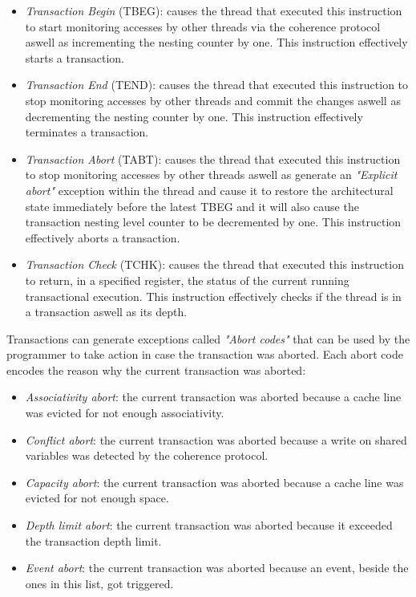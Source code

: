 \documentclass{article}
\begin{document}
            \begin{itemize}

                \item \textit{Transaction Begin} (TBEG): causes the thread that executed this instruction to start monitoring accesses by other threads via the coherence protocol aswell as incrementing the nesting counter by one. This instruction effectively starts a transaction.
                \item \textit{Transaction End} (TEND): causes the thread that executed this instruction to stop monitoring accesses by other threads and commit the changes aswell as decrementing the nesting counter by one. This instruction effectively terminates a transaction.
                \item \textit{Transaction Abort} (TABT): causes the thread that executed this instruction to stop monitoring accesses by other threads aswell as generate an \textit{"Explicit abort"} exception within the thread and cause it to restore the architectural state immediately before the latest TBEG and it will also cause the transaction nesting level counter to be decremented by one. This instruction effectively aborts a transaction.
                \item \textit{Transaction Check} (TCHK): causes the thread that executed this instruction to return, in a specified register, the status of the current running transactional execution. This instruction effectively checks if the thread is in a transaction aswell as its depth.

            \end{itemize}

            Transactions can generate exceptions called \textit{"Abort codes"} that can be used by the programmer to take action in case the transaction was aborted. Each abort code encodes the reason why the current transaction was aborted:

            \begin{itemize}

                \item \textit{Associativity abort}: the current transaction was aborted because a cache line was evicted for not enough associativity.
                \item \textit{Conflict abort}: the current transaction was aborted because a write on shared variables was detected by the coherence protocol.
                \item \textit{Capacity abort}: the current transaction was aborted because a cache line was evicted for not enough space.
                \item \textit{Depth limit abort}: the current transaction was aborted because it exceeded the transaction depth limit.
                \item \textit{Event abort}: the current transaction was aborted because an event, beside the ones in this list, got triggered.

            \end{itemize}
\end{document}
